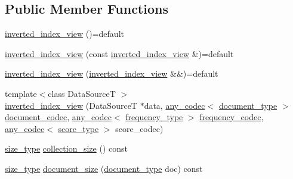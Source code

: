 \subsection*{Public Member Functions}
\begin{DoxyCompactItemize}
\item 
\mbox{\hyperlink{classirk_1_1v2_1_1inverted__index__view_a0cd2fbbd65fbab5bef4933aee9cf9059}{inverted\+\_\+index\+\_\+view}} ()=default
\item 
\mbox{\hyperlink{classirk_1_1v2_1_1inverted__index__view_ac1b707ab5ab781fcc6c28e0beadad71f}{inverted\+\_\+index\+\_\+view}} (const \mbox{\hyperlink{classirk_1_1v2_1_1inverted__index__view}{inverted\+\_\+index\+\_\+view}} \&)=default
\item 
\mbox{\hyperlink{classirk_1_1v2_1_1inverted__index__view_a477477a458d97aa3f5842894ccba191d}{inverted\+\_\+index\+\_\+view}} (\mbox{\hyperlink{classirk_1_1v2_1_1inverted__index__view}{inverted\+\_\+index\+\_\+view}} \&\&)=default
\item 
{\footnotesize template$<$class Data\+SourceT $>$ }\\\mbox{\hyperlink{classirk_1_1v2_1_1inverted__index__view_a1aab95c206287bbec6b7c2ab34ffbf92}{inverted\+\_\+index\+\_\+view}} (Data\+SourceT $\ast$data, \mbox{\hyperlink{namespaceirk_a831a3a869cf19601dbfb5c41765a2e87}{any\+\_\+codec}}$<$ \mbox{\hyperlink{classirk_1_1v2_1_1inverted__index__view_a8441dcf60be934782fdaa9411723700b}{document\+\_\+type}} $>$ \mbox{\hyperlink{classirk_1_1v2_1_1inverted__index__view_aaa1f3b7660025d60cdb815268d56334c}{document\+\_\+codec}}, \mbox{\hyperlink{namespaceirk_a831a3a869cf19601dbfb5c41765a2e87}{any\+\_\+codec}}$<$ \mbox{\hyperlink{classirk_1_1v2_1_1inverted__index__view_ab52405d4c17e6e82893d2650a56e0a32}{frequency\+\_\+type}} $>$ \mbox{\hyperlink{classirk_1_1v2_1_1inverted__index__view_aacf229a3a8f3eddb0181cc0df59ada3a}{frequency\+\_\+codec}}, \mbox{\hyperlink{namespaceirk_a831a3a869cf19601dbfb5c41765a2e87}{any\+\_\+codec}}$<$ \mbox{\hyperlink{classirk_1_1v2_1_1inverted__index__view_a5a1f88560e9fe17b54c7af6e2aa31639}{score\+\_\+type}} $>$ score\+\_\+codec)
\item 
\mbox{\hyperlink{classirk_1_1v2_1_1inverted__index__view_aebba8b75ebd7b14d546a29fe925352d6}{size\+\_\+type}} \mbox{\hyperlink{classirk_1_1v2_1_1inverted__index__view_a2b00000b6c8ccb6acb487494d6d0093b}{collection\+\_\+size}} () const
\item 
\mbox{\hyperlink{classirk_1_1v2_1_1inverted__index__view_aebba8b75ebd7b14d546a29fe925352d6}{size\+\_\+type}} \mbox{\hyperlink{classirk_1_1v2_1_1inverted__index__view_ad259487c825b0d3a4fa40cb3b29ccc6e}{document\+\_\+size}} (\mbox{\hyperlink{classirk_1_1v2_1_1inverted__index__view_a8441dcf60be934782fdaa9411723700b}{document\+\_\+type}} doc) const

\end{DoxyCompactItemize}
